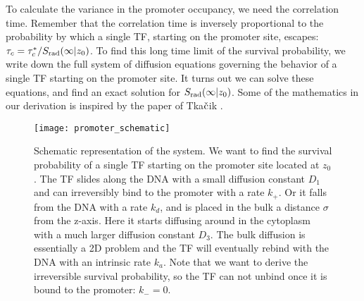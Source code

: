 To calculate the variance in the promoter occupancy, we need the correlation time. Remember that the correlation time is inversely proportional to the probability by which a single TF, starting on the promoter site, escapes: $\tau_c = \tau_c^* / S_{\rm rad}(\infty|z_0)$. To find this long time limit of the survival probability, we write down the full system of diffusion equations governing the behavior of a single TF starting on the promoter site. It turns out we can solve these equations, and find an exact solution for $S_{\rm rad}(\infty|z_0)$. Some of the mathematics in our derivation is inspired by the paper of Tka$\check{\rm c}$ik \cite{Tkacik2009}. 

\begin{figure}[ht]
\centering
\texttt{[image: promoter\_schematic]}
\caption{ Schematic representation of the system. We want to find the survival probability of a single TF starting on the promoter site located at $z_0$. The TF slides along the DNA with a small diffusion constant $D_1$ and can irreversibly bind to the promoter with a rate $k_+$. Or it falls from the DNA with a rate $k_d$, and is placed in the bulk a distance $\sigma$ from the z-axis. Here it starts diffusing around in the cytoplasm with a much larger diffusion constant $D_3$. The bulk diffusion is essentially a 2D problem and the TF will eventually rebind with the DNA with an intrinsic rate $k_a$. Note that we want to derive the irreversible survival probability, so the TF can not unbind once it is bound to the promoter: $k_- = 0$.}
\end{figure}

